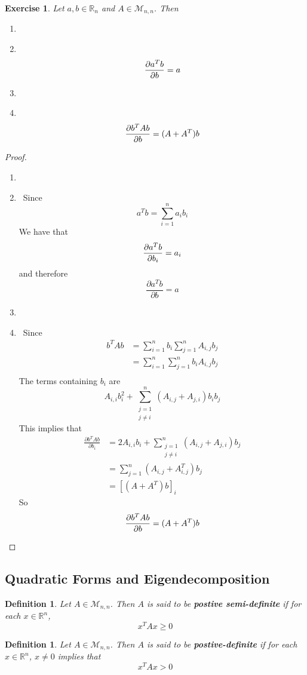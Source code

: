 \documentclass[12pt]{amsart}
\newcommand\Item[1][]{%
  \ifx\relax#1\relax  \item \else \item[#1] \fi
  \abovedisplayskip=0pt\abovedisplayshortskip=0pt~\vspace*{-\baselineskip}}
\newtheorem{defn}[thm]{Definition}
\newtheorem{ex}[thm]{Exercise}
\newcommand{\R}{\mathbb{R}}
\newcommand{\MM}{\mathcal{M}}
\begin{document}
\begin{ex}
Let $a, b  \in \R_n$ and $A \in \MM_{n, n}$. Then \vspace{2mm}
\begin{enumerate}
\Item $$\pdv{a^Tb}{b} = a$$ \vspace{2mm}
\Item $$\pdv{b^T A b}{b} = (A+A^T)b$$
\end{enumerate} 
\end{ex}

\begin{proof}\
\begin{enumerate}
\Item Since $$a^Tb = \sum_{i=1}^n a_ib_i$$ We have that $$\pdv{a^Tb}{b_i} = a_i$$ and therefore $$\frac{\partial a^Tb}{\partial b} = a$$ \vspace{3mm}
\Item Since 
\begin{align*}
b^T A b 
&= \sum_{i = 1}^n b_i \sum_{j=1}^n A_{i,j}b_j \\
&= \sum_{i = 1}^n \sum_{j=1}^n b_iA_{i,j}b_j \\
\end{align*}
The terms containing $b_i$ are $$A_{i,i}b_i^2 + \sum_{\substack{ j=1 \\ j \neq i}}^n (A_{i,j} + A_{j,i})b_ib_j$$
This implies that 
\begin{align*}
\frac{\partial b^TAb}{\partial b_i} 
&= 2A_{i,i}b_i + \sum_{\substack{j=1 \\ j\neq i}}^n (A_{i,j}+A_{j,i})b_j\\
&= \sum_{j=1}^n (A_{i,j}+A^T_{i,j})b_j\\
&= [(A+A^T)b]_i
\end{align*}
So $$\pdv{b^T A b}{b} = (A+A^T)b$$
\end{enumerate}
\end{proof} 

\subsection{Quadratic Forms and Eigendecomposition}

\begin{defn}
Let $A \in \MM_{n, n}$. Then $A$ is said to be \textbf{postive semi-definite} if for each $x \in \R^n$, $$x^TAx \geq 0$$ 
\end{defn}

\begin{defn}
Let $A \in \MM_{n, n}$. Then $A$ is said to be \textbf{postive-definite} if for each $x \in \R^n$, $x \neq 0$ implies that $$x^TAx > 0$$ 
\end{defn}
\end{document}
